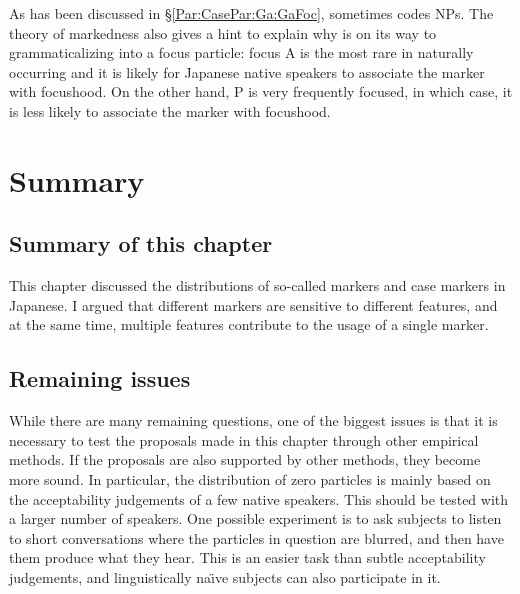 As has been discussed in \S \ref{Par:CasePar:Ga:GaFoc},
 sometimes codes  NPs.
The theory of markedness also gives a hint to explain why  is on its way to grammaticalizing into a focus particle: focus A is the most rare in naturally occurring  and it is likely for Japanese native speakers to associate the marker  with focushood.
On the other hand, P is very frequently focused,
in which case, it is less likely to associate the marker  with focushood.




\section{Summary}

\subsection{Summary of this chapter}
\largerpage
This chapter discussed the distributions of so-called  markers and case markers in Japanese.
I argued that
different markers are sensitive to different features, and
at the same time,
 multiple features contribute to the usage of a single marker.


\subsection{Remaining issues}

While there are many remaining questions,
one of the biggest issues is that
it is necessary to test the proposals made in this chapter through other empirical methods.
If the proposals are also supported by other methods,
they become more sound.
In particular, the distribution of zero particles is mainly based on the acceptability judgements of a few native speakers.
This should be tested with a larger number of speakers.
One possible experiment is to ask subjects to listen to short conversations where the particles in question are blurred,
and then have them produce what they hear.
This is an easier task than subtle acceptability judgements, and linguistically na\"{\i}ve subjects can also participate in it.

